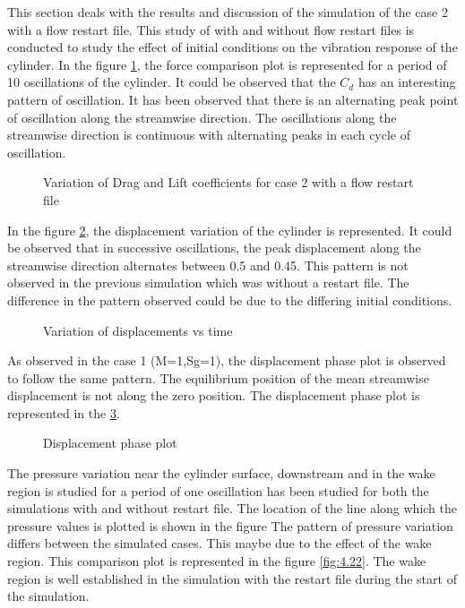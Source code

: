 This section deals with the results and discussion of the simulation of the case 2 with a flow restart file. This study of with and without flow restart files is conducted to study the effect of initial conditions on the vibration response of the cylinder. In the figure \ref{fig:4.18}, the force comparison plot is represented for a period of 10 oscillations of the cylinder. It could be observed that the $C_d$ has an interesting pattern of oscillation. It has been observed that there is an alternating peak point of oscillation along the streamwise direction. The oscillations along the streamwise direction is continuous with alternating peaks in each cycle of oscillation.

\begin{figure}[H]
\centering
\fbox{\texttt{[image: FC\_Sg01\_wr]}}
\caption{Variation of Drag and Lift coefficients for case 2 with a flow restart file}
\label{fig:4.18}
\end{figure}

In the figure \ref{fig:4.19}, the displacement variation of the cylinder is represented. It could be observed that in successive oscillations, the peak displacement along the streamwise direction alternates between 0.5 and 0.45. This pattern is not observed in the previous simulation which was without a restart file. The difference in the pattern observed could be due to the differing initial conditions.  

\begin{figure}[H]
\centering
\fbox{\texttt{[image: DC\_Sg01\_wr]}}
\caption{Variation of displacements vs time}
\label{fig:4.19}
\end{figure}

As observed in the case 1 (M=1,Sg=1), the displacement phase plot is observed to follow the same pattern. The equilibrium position of the mean streamwise displacement is not along the zero position. The displacement phase plot is represented in the \ref{fig:4.20}.

\begin{figure}[H]
\centering
{}
\caption{Displacement phase plot}
\label{fig:4.20}
\end{figure}

The pressure variation near the cylinder surface, downstream and in the wake region is studied for a period of one oscillation has been studied for both the simulations with and without restart file. The location of the line along which the pressure values is plotted is shown in the figure %
The pattern of pressure variation differs between the simulated cases. This maybe due to the effect of the wake region. This comparison plot is represented in the figure \ref{fig:4.22}. The wake region is well established in the simulation with the restart file during the start of the simulation.

